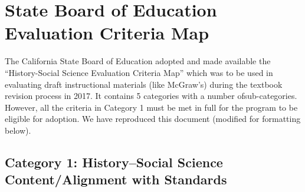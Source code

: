 \chapter[State Board of Education Evaluation\\ Criteria Map]{State Board of Education Evaluation Criteria Map}

The California State Board of Education adopted and made available the “History-Social Science Evaluation Criteria Map” which was to be used in evaluating draft instructional materials (like McGraw’s) during the textbook revision process in 2017. It contains 5 categories with a number of\break sub-categories. However, all the criteria in Category 1 must be met in full for the program to be eligible for adoption. We have reproduced this document (modified for formatting below).

\section*{Category 1: History–Social Science Content/Alignment with Standards} 

